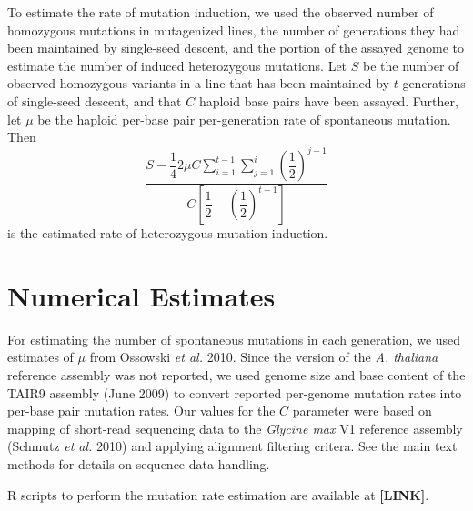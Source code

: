 \documentclass[12pt]{article}
\begin{document}
\par To estimate the rate of mutation induction, we used the observed number of
homozygous mutations in mutagenized lines, the number of generations they had
been maintained by single-seed descent, and the portion of the assayed genome
to estimate the number of induced heterozygous mutations. Let $S$ be the number
of observed homozygous variants in a line that has been maintained by $t$
generations of single-seed descent, and that $C$ haploid base pairs have been
assayed. Further, let $\mu$ be the haploid per-base pair per-generation rate of
spontaneous mutation. Then
$$
\dfrac
    {
        S -
        \dfrac{1}{4}
        2\mu
        C
        \sum_{i=1}^{t-1}
        \sum_{j=1}^{i}
        \left(
            \dfrac{1}{2}
        \right)^{j-1}
    }
    {
        C
        \left[
            \dfrac{1}{2} -
            \left(
                \dfrac{1}{2}
            \right)^{t+1}
        \right]
    }
$$
is the estimated rate of heterozygous mutation induction.

\section*{Numerical Estimates}
\par For estimating the number of spontaneous mutations in each generation, we
used estimates of $\mu$ from Ossowski \textit{et al.} 2010. Since the version
of the \textit{A. thaliana} reference assembly was not reported, we used genome
size and base content of the TAIR9 assembly (June 2009) to convert reported
per-genome mutation rates into per-base pair mutation rates. Our values for the
$C$ parameter were based on mapping of short-read sequencing data to the
\textit{Glycine max} V1 reference assembly (Schmutz \textit{et al.} 2010) and
applying alignment filtering critera. See the main text methods for details on
sequence data handling.

\par R scripts to perform the mutation rate estimation are available at
\textbf{[LINK]}.
\end{document}
